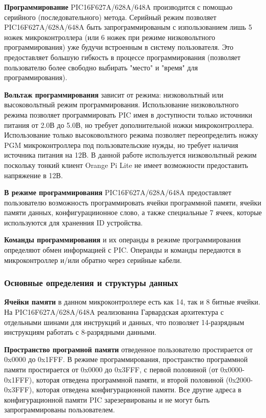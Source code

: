 \textbf{Программирование}
PIC16F627A/628A/648A производится с помощью
серийного (последовательного) метода. Серийный режим позволяет
PIC16F627A/628A/648A быть запрограммированым с изпользованием лишь 5 ножек микроконтроллера (или 6 ножек при режиме низковольтного программирования) уже будучи встроенным
в систему пользователя. Это предоставляет большую гибкость в процессе программирования 
(позволяет пользователю более свободно выбирать "место" и "время" для программирования).

\textbf{Вольтаж программирования}
зависит от режима: низковольтный или высоковольтный режим программирования. Использование низковольтного режима позволяет программировать PIC имея в доступности только источники питания от 2.0В до 5.0В, но требует дополнительной ножки микроконтроллера. Использование только высоковольтного режима позволяет переопределить ножку PGM микроконтроллера под пользовательские нужды, но требует наличия источника питания на 12В. В данной работе используется низковольтный режим поскольку тонкий клиент Orange Pi Lite не имеет возможности предоставить напряжение в 12В.

\textbf{В режиме программирования}
PIC16F627A/628A/648A предоставляет пользователю возможность программировать ячейки
 программной памяти, ячейки памяти данных, конфигурациионное слово, а также специальные 7 ячеек, которые используются для храненния ID устройства.

\textbf{Команды программирования} 
и их операнды в режиме программирования определяют обмен информацией с PIC. Операнды и команды передаются в микроконтроллер и/или обратно через серийные кабели.



\subsubsection{Основные определения и структуры данных}

\textbf{Ячейки памяти}
в данном микроконтроллере есть как 14, так и 8 битные ячейки. 
На PIC16F627A/628A/648A реализованна Гарвардская
архитектура с отдельными шинами для инструкций и данных, что позволяет 
14-разрядным инструкциям работать с 8-разрядными данными.

\textbf{Пространство програмной памяти}
отведенное пользователю простирается от 0x0000 до
0x1FFF. В режиме программирования, пространство программной памяти
простирается от 0x0000 до 0x3FFF, с первой
половиной (от 0x0000-0x1FFF), которая отведена программной памяти, и
второй половиной (0x2000-0x3FFF), которая отведена конфигурационной
памяти. Все другие адреса в конфигурационной памяти PIC зарезервированы 
и не могут быть запрограммированы пользователем.

